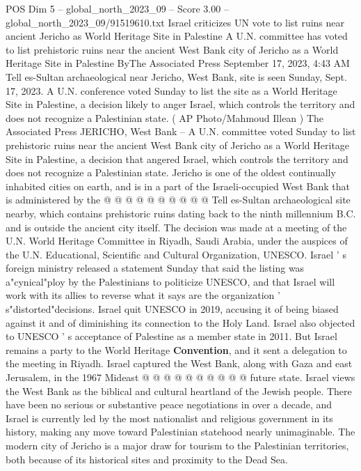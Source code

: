 \begin{textsample}{POS Dim 5 – global\_north\_2023\_09 – Score 3.00 – global\_north\_2023\_09/91519610.txt}  \label{ex:f5_pos_437}
Israel criticizes UN vote to list ruins near ancient Jericho as World Heritage Site in Palestine A U.N. committee has voted to list prehistoric ruins near the ancient West Bank city of Jericho as a World Heritage Site in Palestine ByThe Associated Press September 17, 2023, 4:43 AM Tell es-Sultan archaeological near Jericho, West Bank, site is seen Sunday, Sept. 17, 2023.
A U.N. conference voted Sunday to list the site as a World Heritage Site in Palestine, a decision likely to anger Israel, which controls the territory and does not recognize a Palestinian state. ( AP Photo/Mahmoud Illean ) The Associated Press JERICHO, West Bank -- A U.N. committee voted Sunday to list prehistoric ruins near the ancient West Bank city of Jericho as a World Heritage Site in Palestine, a decision that angered Israel, which controls the territory and does not recognize a Palestinian state.
Jericho is one of the oldest continually inhabited cities on earth, and is in a part of the Israeli-occupied West Bank that is administered by the @ @ @ @ @ @ @ @ @ @ Tell es-Sultan archaeological site nearby, which contains prehistoric ruins dating back to the ninth millennium B.C. and is outside the ancient city itself.
The decision was made at a meeting of the U.N.
World Heritage Committee in Riyadh, Saudi Arabia, under the auspices of the U.N.
Educational, Scientific and Cultural Organization, UNESCO.
Israel ' s foreign ministry released a statement Sunday that said the listing was a"cynical"ploy by the Palestinians to politicize UNESCO, and that Israel will work with its allies to reverse what it says are the organization ' s"distorted"decisions.
Israel quit UNESCO in 2019, accusing it of being biased against it and of diminishing its connection to the Holy Land.
Israel also objected to UNESCO ' s acceptance of Palestine as a member state in 2011.
But Israel remains a party to the World Heritage \textbf{Convention}, and it sent a delegation to the meeting in Riyadh.
Israel captured the West Bank, along with Gaza and east Jerusalem, in the 1967 Mideast @ @ @ @ @ @ @ @ @ @ future state.
Israel views the West Bank as the biblical and cultural heartland of the Jewish people.
There have been no serious or substantive peace negotiations in over a decade, and Israel is currently led by the most nationalist and religious government in its history, making any move toward Palestinian statehood nearly unimaginable.
The modern city of Jericho is a major draw for tourism to the Palestinian territories, both because of its historical sites and proximity to the Dead Sea.

\end{textsample}
